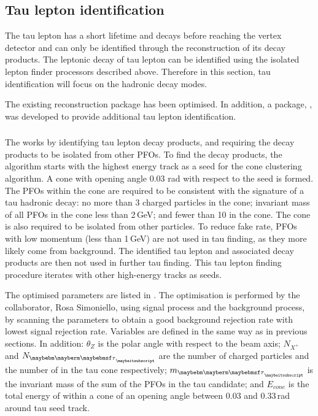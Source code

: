 \subsection{Tau lepton identification}

The tau lepton has a short lifetime and decays before reaching the vertex detector and  can only be identified through the reconstruction of its decay products. The leptonic decay of tau lepton can be identified using the isolated lepton finder processors described above. Therefore in this section, tau identification will focus on the hadronic decay modes.

The existing \TauFinderProcessor  \cite{LCD-Note-2010-009} reconstruction package has been optimised. In addition, a package, \BonoTauFinder, was developed to provide additional tau lepton identification.




\subsubsection{\TauFinderProcessor}

The \TauFinderProcessor works by identifying tau lepton decay products, and requiring the decay products to be isolated from other PFOs. To find the decay products, the algorithm starts with the highest energy track as a seed for the cone clustering algorithm. A cone with opening angle 0.03 rad with respect to the seed is formed. The PFOs within the cone are required to be consistent with the signature of a tau hadronic decay: no more than 3 charged particles in the cone; invariant mass of all PFOs in the cone less than 2\,GeV; and fewer than 10 \PFOs in the cone. The cone is also required to be isolated from other particles. To reduce fake rate, PFOs with low momentum (less than 1\,GeV) are not used  in tau finding, as they more likely come from \ggHad background. The identified tau lepton and associated decay products are then not used in further tau finding. This tau lepton finding procedure iterates with other high-energy tracks as seeds.


The optimised parameters are listed in . The optimisation is performed by the \CLIC collaborator, Rosa Simoniello,  using \eeToHHbbbb signal process and the \eeTo{ \Pquark \Pquark \Pquark \Pquark \Plepton \Pnu} background process, by scanning the parameters to obtain a good background rejection rate with lowest signal rejection rate.  Variables are defined in the same way as in previous sections. In addition: $\theta_Z$ is the polar angle with respect to the beam axis; $N_{X^+}$ and $N_{\Ptau}$ are the number of charged particles and the number of \PFOs  in the tau cone respectively; $m_{\Ptau}$ is the invariant mass of the sum of the PFOs in the tau candidate; and $E_{cone}$ is the total energy of \PFOs within a cone of an opening angle between 0.03 and 0.33\,rad  around tau seed track.


